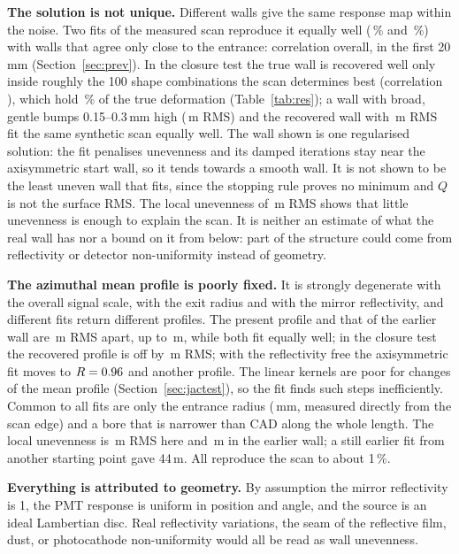 \documentclass[11pt,a4paper]{article}
\newcommand{\um}{\,\textmu m}
\begin{document}
\textbf{The solution is not unique.} Different walls give the same response map within the noise.
Two fits of the measured scan reproduce it equally well (\PrevRmsEarlier\,\% and \PrevRmsNow\,\%) with
walls that agree only close to the entrance: correlation \PrevCorr{} overall, \PrevCorrEntrance{} in
the first 20\,mm (Section~\ref{sec:prev}). In the closure test the true wall is recovered well only
inside roughly the 100 shape combinations the scan determines best (correlation \ResCHundred), which
hold \ResFHundred\,\% of the true deformation (Table~\ref{tab:res}); a wall with broad, gentle bumps
0.15--0.3\,mm high (\ClRmsTrue\um{} RMS) and the recovered wall with \ClRmsRec\um{} RMS fit the same
synthetic scan equally well. The wall shown is one regularised solution: the fit penalises unevenness and its
damped iterations stay near the axisymmetric start wall, so it tends towards a smooth wall. It is not
shown to be the least uneven wall that fits, since the stopping rule proves no minimum and $Q$ is not
the surface RMS. The local unevenness of \LocRms\um{} RMS shows that little unevenness is enough to
explain the scan. It is neither an estimate of what the real wall has nor a bound on it from below:
part of the structure could come from reflectivity or detector non-uniformity instead of geometry.

\textbf{The azimuthal mean profile is poorly fixed.} It is strongly degenerate with the overall signal
scale, with the exit radius and with the mirror reflectivity, and different fits return different
profiles. The present profile and that of the earlier wall are \PrevProfDiff\um{} RMS apart, up to
\PrevProfDiffMax\um, while both fit equally well; in the closure test the recovered profile is off by
\ClProfErr\um{} RMS; with the reflectivity free the axisymmetric fit moves to $R=0.96$ and another
profile. The linear kernels are poor for changes of the mean profile (Section~\ref{sec:jactest}), so
the fit finds such steps inefficiently. Common to all fits are only the entrance radius (\RAp\,mm, measured directly from the scan
edge) and a bore that is narrower than CAD along the whole length. The local unevenness is
\LocRmsOne\um{} RMS here and \PrevLocRms\um{} in the earlier wall; a still earlier fit from another
starting point gave 44\um. All reproduce the scan to about 1\,\%.

\textbf{Everything is attributed to geometry.} By assumption the mirror reflectivity is 1, the PMT
response is uniform in position and angle, and the source is an ideal Lambertian disc. Real
reflectivity variations, the seam of the reflective film, dust, or photocathode non-uniformity would
all be read as wall unevenness.
\end{document}
